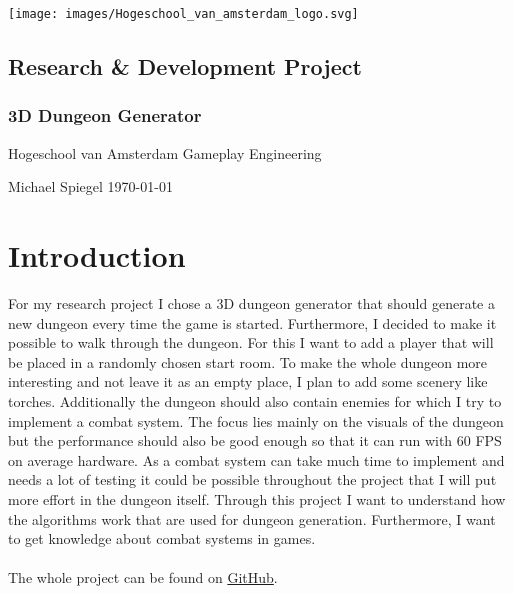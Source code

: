 \documentclass[a4paper,11pt,oneside]{scrreprt}
\begin{document}
\nocite{*}

\thispagestyle{empty}
\begin{titlepage}
  \begin{flushright}
  \texttt{[image: images/Hogeschool\_van\_amsterdam\_logo.svg]}
  \end{flushright}
  \begin{flushleft}
  \section*{Research \& Development Project}
  \subsection*{3D Dungeon Generator}

  \vspace{1cm}
  Hogeschool van Amsterdam\newline
  Gameplay Engineering

  \vspace{0.5cm}

  Michael Spiegel\newline
  \today
  \end{flushleft}
\end{titlepage}

\tableofcontents

\chapter{Introduction}
For my research project I chose a 3D dungeon generator that should generate a new dungeon every time the game is started. Furthermore, I decided to make it possible to walk through the dungeon. For this I want to add a player that will be placed in a randomly chosen start room. To make the whole dungeon more interesting and not leave it as an empty place, I plan to add some scenery like torches. Additionally the dungeon should also contain enemies for which I try to implement a combat system. The focus lies mainly on the visuals of the dungeon but the performance should also be good enough so that it can run with 60 FPS on average hardware. As a combat system can take much time to implement and needs a lot of testing it could be possible throughout the project that I will put more effort in the dungeon itself. Through this project I want to understand how the algorithms work that are used for dungeon generation. Furthermore, I want to get knowledge about combat systems in games.\\
\\
The whole project can be found on \href{https://github.com/Smightym8/3DDungeonGenerator}{GitHub}.
\end{document}
